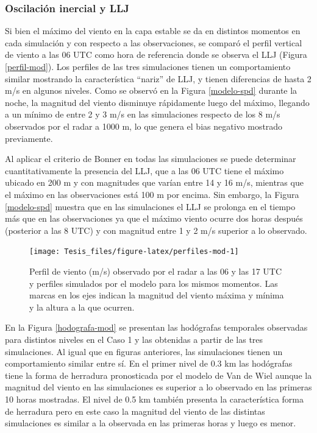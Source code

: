 \documentclass[12pt,spanish,oneside, a4paper]{book}
\begin{document}
\subsubsection{Oscilación inercial y
LLJ}\label{oscilacion-inercial-y-llj-1}

Si bien el máximo del viento en la capa estable se da en distintos
momentos en cada simulación y con respecto a las observaciones, se
comparó el perfil vertical de viento a las 06 UTC como hora de
referencia donde se observa el LLJ (Figura \ref{perfil-mod}). Los
perfiles de las tres simulaciones tienen un comportamiento similar
mostrando la característica ``nariz'' de LLJ, y tienen diferencias de
hasta 2 m/s en algunos niveles. Como se observó en la Figura
\ref{modelo-spd} durante la noche, la magnitud del viento disminuye
rápidamente luego del máximo, llegando a un mínimo de entre 2 y 3 m/s en
las simulaciones respecto de los 8 m/s observados por el radar a 1000 m,
lo que genera el bias negativo mostrado previamente.

Al aplicar el criterio de Bonner en todas las simulaciones se puede
determinar cuantitativamente la presencia del LLJ, que a las 06 UTC
tiene el máximo ubicado en 200 m y con magnitudes que varían entre 14 y
16 m/s, mientras que el máximo en las observaciones está 100 m por
encima. Sin embargo, la Figura \ref{modelo-spd} muestra que en las
simulaciones el LLJ se prolonga en el tiempo más que en las
observaciones ya que el máximo viento ocurre dos horas después
(posterior a las 8 UTC) y con magnitud entre 1 y 2 m/s superior a lo
observado.

\begin{figure}

{\centering \texttt{[image: Tesis\_files/figure-latex/perfiles-mod-1]} 

}

\caption{Perfil de viento (m/s) observado por el radar a las 06 y las 17 UTC y perfiles simulados por el modelo para los mismos momentos. Las marcas en los ejes indican la magnitud del viento máxima y mínima y la altura a la que ocurren. \label{perfil-mod}}\label{fig:perfiles-mod}
\end{figure}

En la Figura \ref{hodografa-mod} se presentan las hodógrafas temporales
observadas para distintos niveles en el Caso 1 y las obtenidas a partir
de las tres simulaciones. Al igual que en figuras anteriores, las
simulaciones tienen un comportamiento similar entre sí. En el primer
nivel de 0.3 km las hodógrafas tiene la forma de herradura pronosticada
por el modelo de Van de Wiel aunque la magnitud del viento en las
simulaciones es superior a lo observado en las primeras 10 horas
mostradas. El nivel de 0.5 km también presenta la característica forma
de herradura pero en este caso la magnitud del viento de las distintas
simulaciones es similar a la observada en las primeras horas y luego es
menor.
\end{document}
